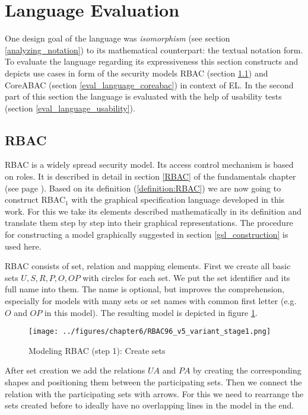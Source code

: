 \documentclass[twoside, openright, 12pt]{book}
\begin{document}
\section{Language Evaluation}
\label{eval_language}
One design goal of the language was \textit{isomorphism} (see section \ref{analyzing_notation}) to its mathematical counterpart: the textual notation form.
To evaluate the language regarding its expressiveness this section constructs and depicts use cases in form of the security models RBAC (section \ref{eval_language_rbac}) and CoreABAC (section \ref{eval_language_coreabac}) in context of EL.
In the second part of this section the language is evaluated with the help of usability tests (section \ref{eval_language_usability}).



\subsection{RBAC}
\label{eval_language_rbac}
RBAC is a widely spread security model.
Its access control mechanism is based on roles.
It is described in detail in section \ref{RBAC} of the fundamentals chapter (see page \pageref{RBAC}).
Based on its definition (\ref{definition:RBAC}) we are now going to construct RBAC$_1$ with the graphical specification language developed in this work.
For this we take its elements described mathematically in its definition and translate them step by step into their graphical representations.
The procedure for constructing a model graphically suggested in section \ref{gsl_construction} is used here.

RBAC consists of set, relation and mapping elements.
First we create all basic sets $U, S, R, P, O, \mathit{OP}$ with circles for each set.
We put the set identifier and its full name into them.
The name is optional, but improves the comprehension, especially for models with many sets or set names with common first letter (e.g.\ $O$ and $\mathit{OP}$ in this model).
The resulting model is depicted in figure \ref{fig:RBAC96_v5_variant_stage1}.

\begin{figure}[htb]
	\centering
	\texttt{[image: ../figures/chapter6/RBAC96\_v5\_variant\_stage1.png]}
	\caption{Modeling RBAC (step 1): Create sets}
	\label{fig:RBAC96_v5_variant_stage1}
\end{figure}

\noindent
After set creation we add the relations $UA$ and $PA$ by creating the corresponding shapes and positioning them between the participating sets.
Then we connect the relation with the participating sets with arrows.
For this we need to rearrange the sets created before to ideally have no overlapping lines in the model in the end.
\end{document}
